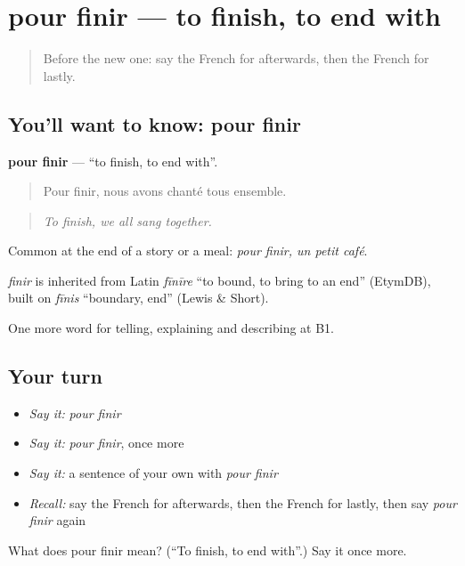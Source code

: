 \section[pour finir]{pour finir — to finish, to end with}

\label{lesson:FR-C268-pour-finir}



\begin{quote}
Before the new one: say the French for afterwards, then the French for lastly.
\end{quote}

\subsection*{You'll want to know: pour finir}
\textbf{pour finir} — \textquotedblleft{}to finish, to end with\textquotedblright{}.

\begin{quote}
Pour finir, nous avons chanté tous ensemble.
\end{quote}

\begin{quote}
\emph{To finish, we all sang together.}
\end{quote}

Common at the end of a story or a meal: \emph{pour finir, un petit café}.

\begin{cousinweb}
\emph{finir} is inherited from Latin \emph{fīnīre} \textquotedblleft{}to bound, to bring to an end\textquotedblright{} (EtymDB), built on \emph{fīnis} \textquotedblleft{}boundary, end\textquotedblright{} (Lewis \& Short).
\end{cousinweb}

\begin{grammarlens}[title={What you've built}]
One more word for telling, explaining and describing at B1.
\end{grammarlens}

\subsection*{Your turn}
\begin{itemize}
\raggedright
  \item \emph{Say it:} \emph{pour finir}
  \item \emph{Say it:} \emph{pour finir}, once more
  \item \emph{Say it:} a sentence of your own with \emph{pour finir}
  \item \emph{Recall:} say the French for afterwards, then the French for lastly, then say \emph{pour finir} again
\end{itemize}

\begin{tcolorbox}[breakable,colback=teal!4,colframe=teal!35!black,title={Before you move on}]
What does pour finir mean? (\textquotedblleft{}To finish, to end with\textquotedblright{}.) Say it once more.
\end{tcolorbox}
